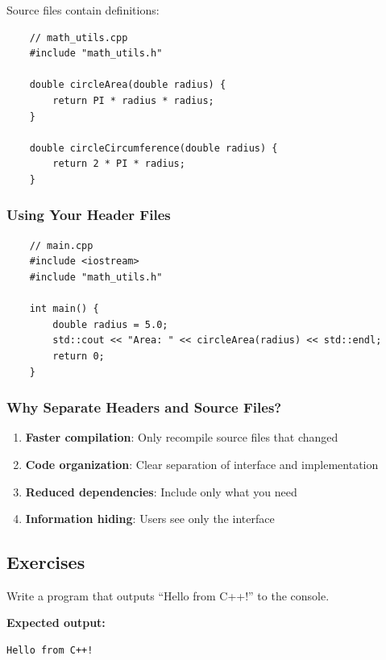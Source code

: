 Source files contain definitions:

\begin{lstlisting}
	// math_utils.cpp
	#include "math_utils.h"
	
	double circleArea(double radius) {
		return PI * radius * radius;
	}
	
	double circleCircumference(double radius) {
		return 2 * PI * radius;
	}
\end{lstlisting}

\subsubsection{Using Your Header Files}

\begin{lstlisting}
	// main.cpp
	#include <iostream>
	#include "math_utils.h"
	
	int main() {
		double radius = 5.0;
		std::cout << "Area: " << circleArea(radius) << std::endl;
		return 0;
	}
\end{lstlisting}

\subsubsection{Why Separate Headers and Source Files?}

\begin{enumerate}
	\item \textbf{Faster compilation}: Only recompile source files that changed
	\item \textbf{Code organization}: Clear separation of interface and implementation
	\item \textbf{Reduced dependencies}: Include only what you need
	\item \textbf{Information hiding}: Users see only the interface
\end{enumerate}

\subsection{Exercises}

\begin{example}{\leavevmode}
	
	Write a program that outputs ``Hello from C++!'' to the console.
	
	\textbf{Expected output:}
	\begin{lstlisting}[numbers=none]
		Hello from C++!
	\end{lstlisting}
\end{example}


